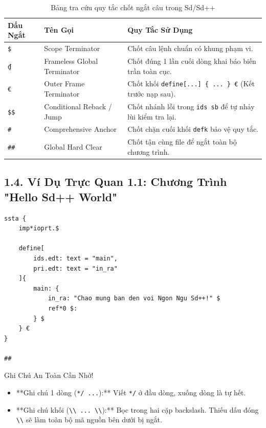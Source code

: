 \documentclass[11pt, a4paper]{article}
\begin{document}
\begin{table}[htbp]
\centering
\begin{tabular}{@{}lll@{}}
\toprule
\textbf{Dấu Ngắt} & \textbf{Tên Gọi} & \textbf{Quy Tắc Sử Dụng} \\ \midrule
\texttt{\$} & Scope Terminator & Chốt câu lệnh chuẩn có khung phạm vi. \\
\texttt{₫} & Frameless Global Terminator & Chốt đúng 1 lần cuối dòng khai báo biến trần toàn cục. \\
\texttt{€} & Outer Frame Terminator & Chốt khối \texttt{define[...] \{ ... \} €} (Kết trước nạp sau). \\
\texttt{\$\$} & Conditional Reback / Jump & Chốt nhánh lỗi trong \texttt{ids sb} để tự nhảy lùi kiểm tra lại. \\
\texttt{\#} & Comprehensive Anchor & Chốt chặn cuối khối \texttt{defk} bảo vệ quy tắc. \\
\texttt{\#\#} & Global Hard Clear & Chốt tận cùng file để ngắt toàn bộ chương trình. \\ \bottomrule
\end{tabular}
\caption{Bảng tra cứu quy tắc chốt ngắt câu trong Sd/Sd++}
\end{table}

\subsection{1.4. Ví Dụ Trực Quan 1.1: Chương Trình "Hello Sd++ World"}
\begin{lstlisting}[caption={Chương trình Hello World đầu tiên}]
ssta {
    imp*ioprt.$

    define[
        ids.edt: text = "main",
        pri.edt: text = "in_ra"
    ]{
        main: {
            in_ra: "Chao mung ban den voi Ngon Ngu Sd++!" $
            ref*0 $:
        } $
    } €
}

##
\end{lstlisting}

\begin{tipbox}{Ghi Chú An Toàn Cần Nhớ!}
\begin{itemize}
    \item **Ghi chú 1 dòng (\texttt{*/ ...}):** Viết \texttt{*/} ở đầu dòng, xuống dòng là tự hết.
    \item **Ghi chú khối (\texttt{\textbackslash\textbackslash{} ... \textbackslash\textbackslash{}}):** Bọc trong hai cặp backslash. Thiếu dấu đóng \texttt{\textbackslash\textbackslash{}} sẽ làm toàn bộ mã nguồn bên dưới bị ngắt.
\end{itemize}
\end{tipbox}
\end{document}
